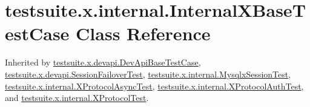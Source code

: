 \hypertarget{classtestsuite_1_1x_1_1internal_1_1_internal_x_base_test_case}{}\section{testsuite.\+x.\+internal.\+Internal\+X\+Base\+Test\+Case Class Reference}
\label{classtestsuite_1_1x_1_1internal_1_1_internal_x_base_test_case}


Inherited by \mbox{\hyperlink{classtestsuite_1_1x_1_1devapi_1_1_dev_api_base_test_case}{testsuite.\+x.\+devapi.\+Dev\+Api\+Base\+Test\+Case}}, \mbox{\hyperlink{classtestsuite_1_1x_1_1devapi_1_1_session_failover_test}{testsuite.\+x.\+devapi.\+Session\+Failover\+Test}}, \mbox{\hyperlink{classtestsuite_1_1x_1_1internal_1_1_mysqlx_session_test}{testsuite.\+x.\+internal.\+Mysqlx\+Session\+Test}}, \mbox{\hyperlink{classtestsuite_1_1x_1_1internal_1_1_x_protocol_async_test}{testsuite.\+x.\+internal.\+X\+Protocol\+Async\+Test}}, \mbox{\hyperlink{classtestsuite_1_1x_1_1internal_1_1_x_protocol_auth_test}{testsuite.\+x.\+internal.\+X\+Protocol\+Auth\+Test}}, and \mbox{\hyperlink{classtestsuite_1_1x_1_1internal_1_1_x_protocol_test}{testsuite.\+x.\+internal.\+X\+Protocol\+Test}}.

